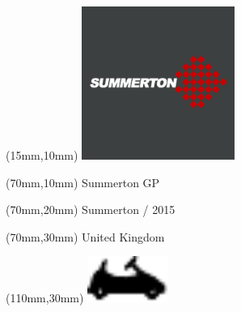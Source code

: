 \null\newpage
\begin{textblock*}{50mm}(15mm,10mm)%
\includegraphics[width=50mm]{LG/SUMM.png}
\end{textblock*}
\begin{textblock*}{130mm}(70mm,10mm)%
{\fontsize{20}{20}\selectfont Summerton GP}\\
\end{textblock*}
\begin{textblock*}{120mm}(70mm,20mm)%
{\fontsize{16}{16}\selectfont Summerton / 2015}\\
\end{textblock*}
\begin{textblock*}{120mm}(70mm,30mm)%
{\fontsize{12}{12}\selectfont United Kingdom}
\end{textblock*}
\begin{textblock*}{30mm}(110mm,30mm)%
\centering
\includegraphics[height=15mm]{icons/kart.pdf}
\end{textblock*}
